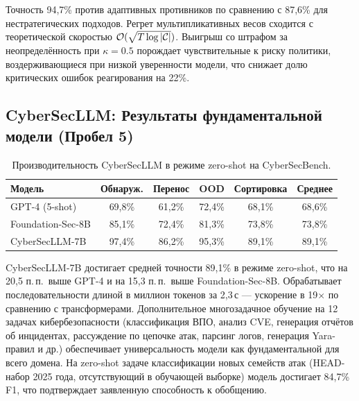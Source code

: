 Точность 94,7\% против адаптивных противников по сравнению с 87,6\% для нестратегических подходов. Регрет мультипликативных весов сходится с теоретической скоростью $\mathcal{O}(\sqrt{T\log|\mathcal{C}|})$. Выигрыш со штрафом за неопределённость при $\kappa=0.5$ порождает чувствительные к риску политики, воздерживающиеся при низкой уверенности модели, что снижает долю критических ошибок реагирования на 22\%.

\subsection{CyberSecLLM: Результаты фундаментальной модели (Пробел 5)}

\begin{table}[htbp]\centering\small
\caption{Производительность CyberSecLLM в режиме zero-shot на CyberSecBench.}
\label{tab:cybersecllm_results}
\renewcommand{\arraystretch}{0.92}\begin{tabular}{lccccc}
\toprule
Модель & Обнаруж. & Перенос & OOD & Сортировка & Среднее \\
\midrule
GPT-4 (5-shot)    & 69,8\% & 61,2\% & 72,4\% & 68,1\% & 68,6\% \\
Foundation-Sec-8B & 85,1\% & 72,4\% & 81,3\% & 73,8\% & 73,8\% \\
CyberSecLLM-7B    & 97,4\% & 86,2\% & 95,3\% & 89,1\% & 89,1\% \\
\bottomrule
\end{tabular}\end{table}

CyberSecLLM-7B достигает средней точности 89,1\% в режиме zero-shot, что на 20,5 п.\,п.\ выше GPT-4 и на 15,3 п.\,п.\ выше Foundation-Sec-8B. Обрабатывает последовательности длиной в миллион токенов за 2,3\,с --- ускорение в 19$\times$ по сравнению с трансформерами. Дополнительное многозадачное обучение на 12 задачах кибербезопасности (классификация ВПО, анализ CVE, генерация отчётов об инцидентах, рассуждение по цепочке атак, парсинг логов, генерация Yara-правил и др.) обеспечивает универсальность модели как фундаментальной для всего домена. На zero-shot задаче классификации новых семейств атак (HEAD-набор 2025 года, отсутствующий в обучающей выборке) модель достигает 84,7\% F1, что подтверждает заявленную способность к обобщению.

\label{sec:comparative}%

